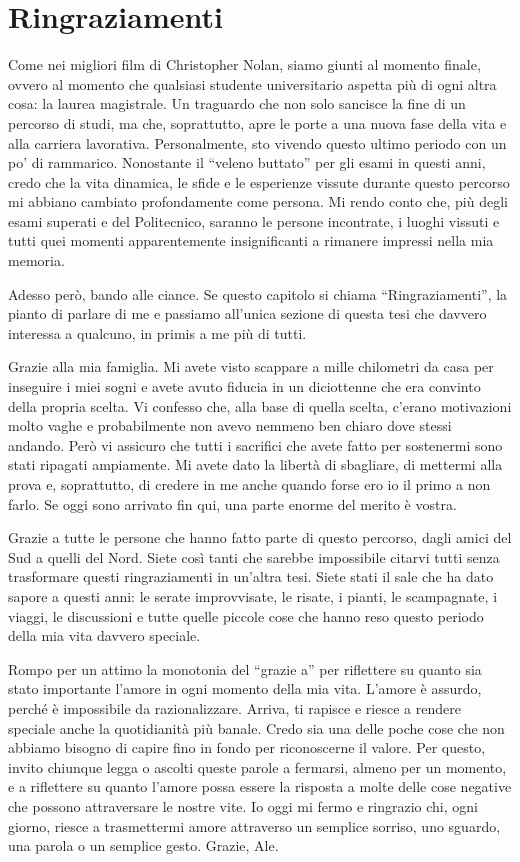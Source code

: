 \chapter*{Ringraziamenti}

Come nei migliori film di Christopher Nolan, siamo giunti al momento finale, ovvero al momento che qualsiasi studente universitario aspetta più di ogni altra cosa: la laurea magistrale. Un traguardo che non solo sancisce la fine di un percorso di studi, ma che, soprattutto, apre le porte a una nuova fase della vita e alla carriera lavorativa. Personalmente, sto vivendo questo ultimo periodo con un po' di rammarico. Nonostante il ``veleno buttato'' per gli esami in questi anni, credo che la vita dinamica, le sfide e le esperienze vissute durante questo percorso mi abbiano cambiato profondamente come persona. Mi rendo conto che, più degli esami superati e del Politecnico, saranno le persone incontrate, i luoghi vissuti e tutti quei momenti apparentemente insignificanti a rimanere impressi nella mia memoria.

Adesso però, bando alle ciance. Se questo capitolo si chiama ``Ringraziamenti'', la pianto di parlare di me e passiamo all'unica sezione di questa tesi che davvero interessa a qualcuno, in primis a me più di tutti.

Grazie alla mia famiglia. Mi avete visto scappare a mille chilometri da casa per inseguire i miei sogni e avete avuto fiducia in un diciottenne che era convinto della propria scelta. Vi confesso che, alla base di quella scelta, c'erano motivazioni molto vaghe e probabilmente non avevo nemmeno ben chiaro dove stessi andando. Però vi assicuro che tutti i sacrifici che avete fatto per sostenermi sono stati ripagati ampiamente. Mi avete dato la libertà di sbagliare, di mettermi alla prova e, soprattutto, di credere in me anche quando forse ero io il primo a non farlo. Se oggi sono arrivato fin qui, una parte enorme del merito è vostra.

Grazie a tutte le persone che hanno fatto parte di questo percorso, dagli amici del Sud a quelli del Nord. Siete così tanti che sarebbe impossibile citarvi tutti senza trasformare questi ringraziamenti in un'altra tesi. Siete stati il sale che ha dato sapore a questi anni: le serate improvvisate, le risate, i pianti, le scampagnate, i viaggi, le discussioni e tutte quelle piccole cose che hanno reso questo periodo della mia vita davvero speciale.

Rompo per un attimo la monotonia del ``grazie a'' per riflettere su quanto sia stato importante l'amore in ogni momento della mia vita. L'amore è assurdo, perché è impossibile da razionalizzare. Arriva, ti rapisce e riesce a rendere speciale anche la quotidianità più banale. Credo sia una delle poche cose che non abbiamo bisogno di capire fino in fondo per riconoscerne il valore. Per questo, invito chiunque legga o ascolti queste parole a fermarsi, almeno per un momento, e a riflettere su quanto l'amore possa essere la risposta a molte delle cose negative che possono attraversare le nostre vite. Io oggi mi fermo e ringrazio chi, ogni giorno, riesce a trasmettermi amore attraverso un semplice sorriso, uno sguardo, una parola o un semplice gesto. Grazie, Ale.

